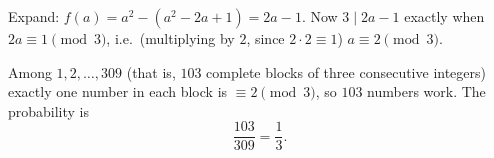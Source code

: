 Expand: $f(a)=a^2-(a^2-2a+1)=2a-1$. Now $3\mid2a-1$ exactly when $2a\equiv1\pmod3$, i.e.\ (multiplying by $2$, since $2\cdot2\equiv1$) $a\equiv2\pmod3$.

Among $1,2,\dots,309$ (that is, $103$ complete blocks of three consecutive integers) exactly one number in each block is $\equiv2\pmod3$, so $103$ numbers work. The probability is
\[
\dfrac{103}{309}=\boxed{\dfrac{1}{3}}.
\]
